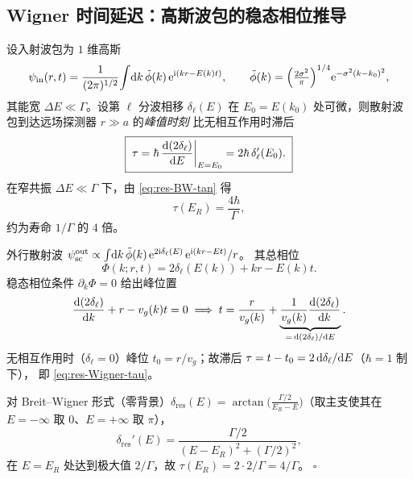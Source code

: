 \subsection{Wigner 时间延迟：高斯波包的稳态相位推导}\label{subsec:res-Wigner}

\begin{theorem}\label{thm:res-Wigner}
  设入射波包为 $1$ 维高斯
  \begin{equation}
    \psi_{\mathrm{in}}(r,t)=\frac{1}{(2\pi)^{1/2}}\!\int\!\mathrm{d} k\,
    \tilde\phi(k)\,\mathrm{e}^{\mathrm{i}(kr-E(k)t)},\qquad
    \tilde\phi(k)=\Big(\tfrac{2\sigma^2}{\pi}\Big)^{1/4}\mathrm{e}^{-\sigma^2(k-k_0)^2},
  \end{equation}
  其能宽 $\Delta E\ll \Gamma$。设第 $\ell$ 分波相移 $\delta_\ell(E)$ 在
  $E_0=E(k_0)$ 处可微，则散射波包到达远场探测器 $r\gg a$ 的\emph{峰值时刻}
  比无相互作用时滞后
  \begin{equation}\label{eq:res-Wigner-tau}
    \boxed{\;\tau=\hbar\,\frac{\mathrm{d}(2\delta_\ell)}{\mathrm{d} E}\bigg|_{E=E_0}
            =2\hbar\,\delta_\ell'(E_0).\;}
  \end{equation}
  在窄共振 $\Delta E\ll \Gamma$ 下，由 \eqref{eq:res-BW-tan} 得
  \begin{equation}\label{eq:res-Wigner-tau-narrow}
    \tau(E_R)=\frac{4\hbar}{\Gamma},
  \end{equation}
  约为寿命 $1/\Gamma$ 的 $4$ 倍。
\end{theorem}

\begin{proof*}
  外行散射波 $\psi_{\mathrm{sc}}^{\mathrm{out}}\propto
  \int\!\mathrm{d} k\,\tilde\phi(k)\,\mathrm{e}^{2\mathrm{i}\delta_\ell(E)}\,\mathrm{e}^{\mathrm{i}(kr-E t)}/r$。
  其总相位
  \begin{equation*}
    \Phi(k;r,t)=2\delta_\ell(E(k))+kr-E(k)t.
  \end{equation*}
  稳态相位条件 $\partial_k\Phi=0$ 给出峰位置
  \begin{equation*}
    \frac{\mathrm{d}(2\delta_\ell)}{\mathrm{d} k}+r-v_g(k)t=0
    \;\Longrightarrow\;
    t=\frac{r}{v_g(k)}+\underbrace{\frac{1}{v_g(k)}\frac{\mathrm{d}(2\delta_\ell)}{\mathrm{d} k}}_{=\,\mathrm{d}(2\delta_\ell)/\mathrm{d} E}.
  \end{equation*}
  无相互作用时（$\delta_\ell=0$）峰位 $t_0=r/v_g$；故滞后
  $\tau=t-t_0=2\,\mathrm{d}\delta_\ell/\mathrm{d} E$（$\hbar=1$ 制下），
  即 \eqref{eq:res-Wigner-tau}。

  对 Breit--Wigner 形式（零背景）$\delta_{\mathrm{res}}(E)=
  \arctan\!\big(\tfrac{\Gamma/2}{E_R-E}\big)$（取主支使其在
  $E=-\infty$ 取 $0$、$E=+\infty$ 取 $\pi$），
  \begin{equation*}
    \delta_{\mathrm{res}}'(E)
    =\frac{\Gamma/2}{(E-E_R)^2+(\Gamma/2)^2},
  \end{equation*}
  在 $E=E_R$ 处达到极大值 $2/\Gamma$，故 $\tau(E_R)=2\cdot 2/\Gamma=4/\Gamma$。
  $\square$
\end{proof*}

